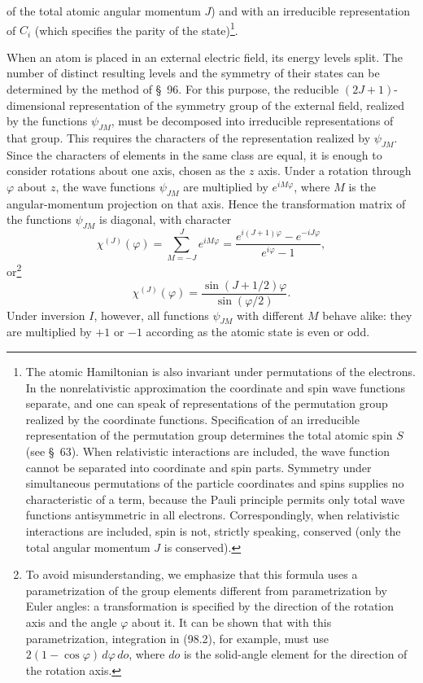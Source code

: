 of the total atomic angular momentum $J$) and with an irreducible representation of $C_i$ (which specifies the parity of the state)\footnote{The atomic Hamiltonian is also invariant under permutations of the electrons. In the nonrelativistic approximation the coordinate and spin wave functions separate, and one can speak of representations of the permutation group realized by the coordinate functions. Specification of an irreducible representation of the permutation group determines the total atomic spin $S$ (see \S~63). When relativistic interactions are included, the wave function cannot be separated into coordinate and spin parts. Symmetry under simultaneous permutations of the particle coordinates and spins supplies no characteristic of a term, because the Pauli principle permits only total wave functions antisymmetric in all electrons. Correspondingly, when relativistic interactions are included, spin is not, strictly speaking, conserved (only the total angular momentum $J$ is conserved).}.

When an atom is placed in an external electric field, its energy levels split. The number of distinct resulting levels and the symmetry of their states can be determined by the method of \S~96. For this purpose, the reducible $(2J+1)$-dimensional representation of the symmetry group of the external field, realized by the functions $\psi_{JM}$, must be decomposed into irreducible representations of that group. This requires the characters of the representation realized by $\psi_{JM}$. Since the characters of elements in the same class are equal, it is enough to consider rotations about one axis, chosen as the $z$ axis. Under a rotation through $\varphi$ about $z$, the wave functions $\psi_{JM}$ are multiplied by $e^{iM\varphi}$, where $M$ is the angular-momentum projection on that axis. Hence the transformation matrix of the functions $\psi_{JM}$ is diagonal, with character
\[
 \chi^{(J)}(\varphi)=\sum_{M=-J}^{J}e^{iM\varphi}
 =\frac{e^{i(J+1)\varphi}-e^{-iJ\varphi}}{e^{i\varphi}-1},
\]
or\footnote{To avoid misunderstanding, we emphasize that this formula uses a parametrization of the group elements different from parametrization by Euler angles: a transformation is specified by the direction of the rotation axis and the angle $\varphi$ about it. It can be shown that with this parametrization, integration in (98.2), for example, must use $2(1-\cos\varphi)\,d\varphi\,do$, where $do$ is the solid-angle element for the direction of the rotation axis.}
\begin{equation}
 \chi^{(J)}(\varphi)=\frac{\sin(J+1/2)\varphi}{\sin(\varphi/2)}.
 \tag{98.3}
\end{equation}
Under inversion $I$, however, all functions $\psi_{JM}$ with different $M$ behave alike: they are multiplied by $+1$ or $-1$ according as the atomic state is even or odd.

